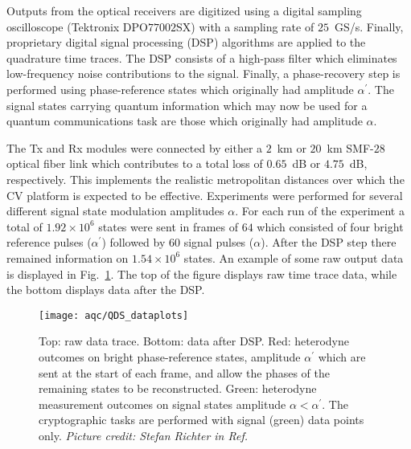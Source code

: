 Outputs from the optical receivers are digitized using a digital sampling oscilloscope (Tektronix DPO$77002$SX) with a sampling rate of $25$~GS/s. Finally, proprietary digital signal processing (DSP) algorithms are applied to the quadrature time traces. The DSP consists of a high-pass filter which eliminates low-frequency noise contributions to the signal. Finally, a phase-recovery step is performed using phase-reference states which originally had amplitude $\alpha^\prime$. The signal states carrying quantum information which may now be used for a quantum communications task are those which originally had amplitude $\alpha$.

The Tx and Rx modules were connected by either a $2$~km or $20$~km SMF-$28$ optical fiber link which contributes to a total loss of $0.65$~dB or $4.75$~dB, respectively. This implements the realistic metropolitan distances over which the CV platform is expected to be effective. Experiments were performed for several different signal state modulation amplitudes $\alpha$. For each run of the experiment a total of $1.92\times 10^6$ states were sent in frames of $64$ which consisted of four bright reference pulses ($\alpha^\prime$) followed by $60$ signal pulses ($\alpha$). After the DSP step there remained information on $1.54 \times 10^6$ states. An example of some raw output data is displayed in Fig.~\ref{fig:aqc_experimental_trace}. The top of the figure displays raw time trace data, while the bottom displays data after the DSP.


\begin{figure}[htp]
\centering
\texttt{[image: aqc/QDS\_dataplots]}
\caption{\label{fig:aqc_experimental_trace} Top: raw data trace. Bottom: data after DSP. Red: heterodyne outcomes on bright phase-reference states, amplitude $\alpha^\prime$ which are sent at the start of each frame, and allow the phases of the remaining states to be reconstructed. Green: heterodyne measurement outcomes on signal states amplitude $\alpha < \alpha^\prime$. The cryptographic tasks are performed with signal (green) data points only. \emph{Picture credit: Stefan Richter in Ref.~\cite{Richter2020}}}
\end{figure}

\clearpage

